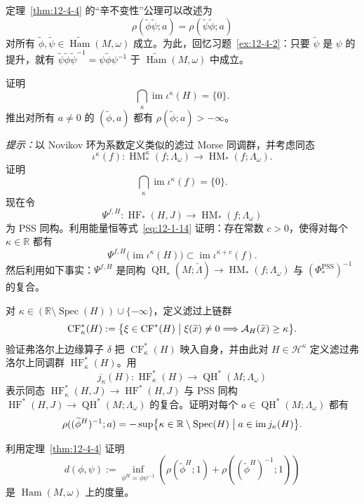 \begin{remark}\label{rem:12-4-5}
定理~\ref{thm:12-4-4} 的“辛不变性”公理可以改述为
\[
  \rho(\widetilde\phi\widetilde\psi;a)
  =\rho(\widetilde\psi\widetilde\phi;a)
\]
对所有 $\widetilde\phi,\widetilde\psi\in
\widetilde{\operatorname{Ham}}(M,\omega)$ 成立。为此，回忆习题~\ref{ex:12-4-2}：只要
$\widetilde\psi$ 是 $\psi$ 的提升，就有
$\widetilde\psi\widetilde\phi\widetilde\psi^{-1}
=\psi\widetilde\phi\psi^{-1}$ 于
$\widetilde{\operatorname{Ham}}(M,\omega)$ 中成立。
\end{remark}

\begin{exercise}\label{ex:12-4-6}
证明
\[
  \bigcap_\kappa\operatorname{im}\iota^\kappa(H)=\{0\}.
\]
推出对所有 $a\ne0$ 的 $(\widetilde\phi,a)$ 都有
$\rho(\widetilde\phi;a)>-\infty$。

\emph{提示：}以 Novikov 环为系数定义类似的滤过 Morse 同调群，并考虑同态
\[
  \iota^\kappa(f):\operatorname{HM}_*^\kappa(f;\Lambda_\omega)
  \longrightarrow\operatorname{HM}_*(f;\Lambda_\omega).
\]
证明
\[
  \bigcap_\kappa\operatorname{im}\iota^\kappa(f)=\{0\}.
\]
现在令
\[
  \Psi^{f,H}:\operatorname{HF}_*(H,J)
  \longrightarrow\operatorname{HM}_*(f;\Lambda_\omega)
\]
为 PSS 同构。利用能量恒等式~\eqref{eq:12-1-14} 证明：存在常数 $c>0$，使得对每个
$\kappa\in\mathbb R$ 都有
\[
  \Psi^{f,H}\bigl(\operatorname{im}\iota^\kappa(H)\bigr)
  \subset\operatorname{im}\iota^{\kappa+c}(f).
\]
然后利用如下事实：$\Psi^{f,H}$ 是同构
$\operatorname{QH}_*(M;\check\Lambda)\to
\operatorname{HM}_*(f;\Lambda_\omega)$ 与
$(\Phi_*^{\mathrm{PSS}})^{-1}$ 的复合。
\end{exercise}

\begin{exercise}\label{ex:12-4-7}
对 $\kappa\in(\mathbb R\setminus\operatorname{Spec}(H))\cup\{-\infty\}$，定义滤过上链群
\[
  \operatorname{CF}^*_\kappa(H)
  :=\bigl\{\xi\in\operatorname{CF}^*(H)\bigm|
  \xi(\widetilde x)\ne0\Longrightarrow
  \mathcal A_H(\widetilde x)\ge\kappa\bigr\}.
\]
验证弗洛尔上边缘算子 $\delta$ 把 $\operatorname{CF}^*_\kappa(H)$ 映入自身，并由此对
$H\in\mathcal H^\kappa$ 定义滤过弗洛尔上同调群
$\operatorname{HF}^*_\kappa(H)$。用
\[
  j_\kappa(H):\operatorname{HF}^*_\kappa(H)
  \longrightarrow\operatorname{QH}^*(M;\Lambda_\omega)
\]
表示同态 $\operatorname{HF}^*_\kappa(H,J)\to\operatorname{HF}^*(H,J)$ 与 PSS 同构
$\operatorname{HF}^*(H,J)\to\operatorname{QH}^*(M;\Lambda_\omega)$ 的复合。证明对每个
$a\in\operatorname{QH}^*(M;\Lambda_\omega)$ 都有
\begin{equation}\label{eq:12-4-12}
  \rho((\widetilde\phi^H)^{-1};a)
  =-\sup\bigl\{\kappa\in\mathbb R\setminus\operatorname{Spec}(H)
  \bigm|a\in\operatorname{im}j_\kappa(H)\bigr\}.
\end{equation}
\end{exercise}

\begin{exercise}\label{ex:12-4-8}
利用定理~\ref{thm:12-4-4} 证明
\[
  d(\phi,\psi)
  :=\inf_{\phi^H=\phi\psi^{-1}}
  \left(\rho(\widetilde\phi^H;1)
  +\rho((\widetilde\phi^H)^{-1};1)\right)
\]
是 $\operatorname{Ham}(M,\omega)$ 上的度量。
\end{exercise}
